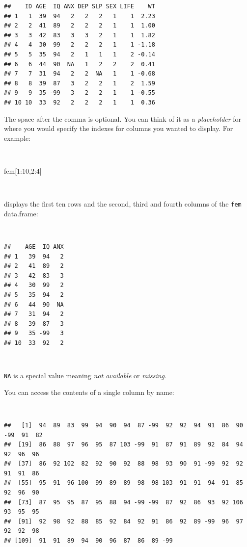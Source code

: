 \documentclass[
  12pt,
]{book}
\newenvironment{Shaded}{\begin{snugshade}}{\end{snugshade}}
\newcommand{\DecValTok}[1]{\textcolor[rgb]{0.00,0.00,0.81}{#1}}
\newcommand{\NormalTok}[1]{#1}
\newcommand{\SpecialCharTok}[1]{\textcolor[rgb]{0.00,0.00,0.00}{#1}}
\begin{document}
\begin{verbatim}
##    ID AGE  IQ ANX DEP SLP SEX LIFE    WT
## 1   1  39  94   2   2   2   1    1  2.23
## 2   2  41  89   2   2   2   1    1  1.00
## 3   3  42  83   3   3   2   1    1  1.82
## 4   4  30  99   2   2   2   1    1 -1.18
## 5   5  35  94   2   1   1   1    2 -0.14
## 6   6  44  90  NA   1   2   2    2  0.41
## 7   7  31  94   2   2  NA   1    1 -0.68
## 8   8  39  87   3   2   2   1    2  1.59
## 9   9  35 -99   3   2   2   1    1 -0.55
## 10 10  33  92   2   2   2   1    1  0.36
\end{verbatim}

\newpage

The space after the comma is optional. You can think of it as a \emph{placeholder} for where you would specify the indexes for columns you wanted to display. For example:

~

\begin{Shaded}
\begin{Highlighting}[]
\NormalTok{fem[}\DecValTok{1}\SpecialCharTok{:}\DecValTok{10}\NormalTok{,}\DecValTok{2}\SpecialCharTok{:}\DecValTok{4}\NormalTok{]}
\end{Highlighting}
\end{Shaded}

~

displays the first ten rows and the second, third and fourth columns of the \texttt{fem} data.frame:

~

\begin{verbatim}
##    AGE  IQ ANX
## 1   39  94   2
## 2   41  89   2
## 3   42  83   3
## 4   30  99   2
## 5   35  94   2
## 6   44  90  NA
## 7   31  94   2
## 8   39  87   3
## 9   35 -99   3
## 10  33  92   2
\end{verbatim}

~

\texttt{NA} is a special value meaning \emph{not available} or \emph{missing}.

You can access the contents of a single column by name:

~

\begin{Shaded}
\end{Shaded}

\begin{verbatim}
##   [1]  94  89  83  99  94  90  94  87 -99  92  92  94  91  86  90 -99  91  82
##  [19]  86  88  97  96  95  87 103 -99  91  87  91  89  92  84  94  92  96  96
##  [37]  86  92 102  82  92  90  92  88  98  93  90  91 -99  92  92  91  91  86
##  [55]  95  91  96 100  99  89  89  98  98 103  91  91  94  91  85  92  96  90
##  [73]  87  95  95  87  95  88  94 -99 -99  87  92  86  93  92 106  93  95  95
##  [91]  92  98  92  88  85  92  84  92  91  86  92  89 -99  96  97  92  92  98
## [109]  91  91  89  94  90  96  87  86  89 -99
\end{verbatim}
\end{document}
